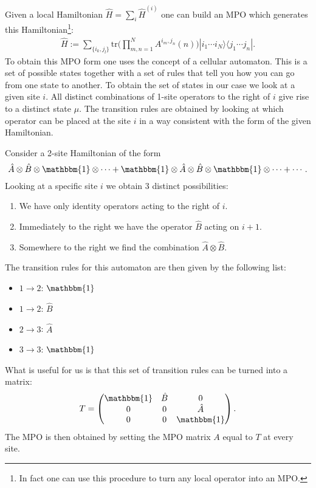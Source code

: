     \begin{method}
        Given a local Hamiltonian $\hat{H}=\sum_i\hat{H}^{(i)}$ one can build an MPO which generates this Hamiltonian\footnote{In fact one can use this procedure to turn any local operator into an MPO.}:
        \begin{gather}
            \hat{H} := \sum_{\{i_k,j_l\}}\text{tr}\Big(\prod_{m,n=1}^NA^{i_m,j_n}(n)\Big)|i_1\cdots i_N\rangle\langle j_1\cdots j_n|.
        \end{gather}
        To obtain this MPO form one uses the concept of a cellular automaton. This is a set of possible states together with a set of rules that tell you how you can go from one state to another. To obtain the set of states in our case we look at a given site $i$. All distinct combinations of 1-site operators to the right of $i$ give rise to a distinct state $\mu$. The transition rules are obtained by looking at which operator can be placed at the site $i$ in a way consistent with the form of the given Hamiltonian.
    \end{method}
    \begin{example}
        Consider a 2-site Hamiltonian of the form \[\hat{A}\otimes\hat{B}\otimes\mathbbm{1}\otimes\cdots+\mathbbm{1}\otimes\hat{A}\otimes\hat{B}\otimes\mathbbm{1}\otimes\cdots+\cdots.\] Looking at a specific site $i$ we obtain 3 distinct possibilities:
        \begin{enumerate}
            \item We have only identity operators acting to the right of $i$.
            \item Immediately to the right we have the operator $\hat{B}$ acting on $i+1$.
            \item Somewhere to the right we find the combination $\hat{A}\otimes\hat{B}$.
        \end{enumerate}
        The transition rules for this automaton are then given by the following list:
        \begin{itemize}
            \item $1\rightarrow2$: $\mathbbm{1}$
            \item $1\rightarrow2$: $\hat{B}$
            \item $2\rightarrow3$: $\hat{A}$
            \item $3\rightarrow3$: $\mathbbm{1}$
        \end{itemize}
        What is useful for us is that this set of transition rules can be turned into a matrix: \[T=\begin{pmatrix}\mathbbm{1}&\hat{B}&0\\0&0&\hat{A}\\0&0&\mathbbm{1}\end{pmatrix}.\] The MPO is then obtained by setting the MPO matrix $A$ equal to $T$ at every site.
    \end{example}


